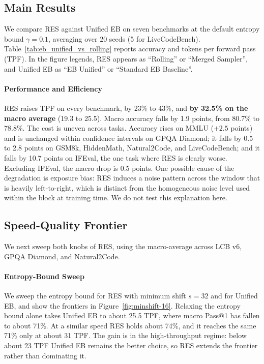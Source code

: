 
\subsection{Main Results}
We compare RES against Unified EB on seven benchmarks at the default entropy bound $\gamma = 0.1$, averaging over 20 seeds (5 for LiveCodeBench).
Table~\ref{tab:eb_unified_vs_rolling} reports accuracy and tokens per forward pass (TPF).
In the figure legends, RES appears as ``Rolling'' or ``Merged Sampler'', and Unified EB as ``EB Unified'' or ``Standard EB Baseline''.



\paragraph{Performance and Efficiency}
RES raises TPF on every benchmark, by 23\% to 43\%, and \textbf{by 32.5\% on the macro average} (19.3 to 25.5).
Macro accuracy falls by 1.9 points, from 80.7\% to 78.8\%.
The cost is uneven across tasks.
Accuracy rises on MMLU ($+2.5$ points) and is unchanged within confidence intervals on GPQA Diamond; it falls by 0.5 to 2.8 points on GSM8k, HiddenMath, Natural2Code, and LiveCodeBench; and it falls by 10.7 points on IFEval, the one task where RES is clearly worse.
Excluding IFEval, the macro drop is 0.5 points.
One possible cause of the degradation is exposure bias: RES induces a noise pattern across the window that is heavily left-to-right, which is distinct from the homogeneous noise level used within the block at training time.
We do not test this explanation here.

\subsection{Speed-Quality Frontier}
We next sweep both knobs of RES, using the macro-average across LCB v6, GPQA Diamond, and Natural2Code.



\paragraph{Entropy-Bound Sweep}
We sweep the entropy bound for RES with minimum shift $s=32$ and for Unified EB, and show the frontiers in Figure~\ref{fig:minshift-16}.
Relaxing the entropy bound alone takes Unified EB to about 25.5 TPF, where macro Pass@1 has fallen to about 71\%.
At a similar speed RES holds about 74\%, and it reaches the same 71\% only at about 31 TPF.
The gain is in the high-throughput regime: below about 23 TPF Unified EB remains the better choice, so RES extends the frontier rather than dominating it.


